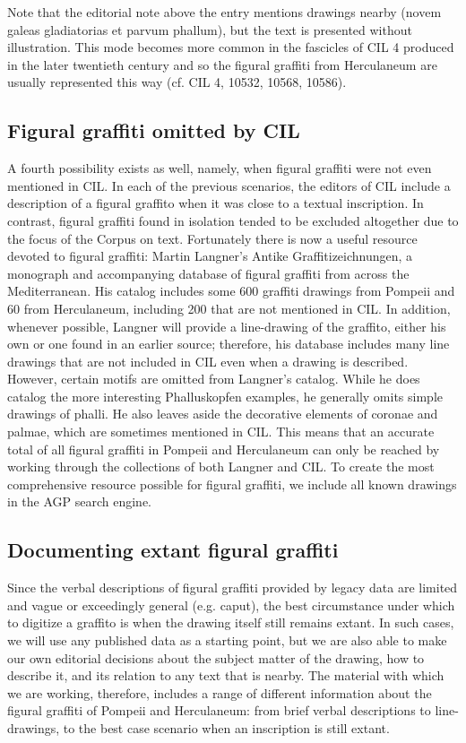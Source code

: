 \documentclass[amsthm,ebook]{saparticle}
\begin{document}
Note that the editorial note above the entry mentions drawings nearby (novem galeas gladiatorias et parvum phallum), but
the text is presented without illustration. This mode becomes more common in the fascicles of CIL 4 produced in the
later twentieth century and so the figural graffiti from Herculaneum are usually represented this way (cf. CIL 4,
10532, 10568, 10586). 




\subsection{Figural graffiti omitted by CIL}


A fourth possibility exists as well, namely, when figural graffiti were not even mentioned in CIL. In each of the
previous scenarios, the editors of CIL include a description of a figural graffito when it was close to a textual
inscription. In contrast, figural graffiti found in isolation tended to be excluded altogether due to the focus of the
Corpus on text. Fortunately there is now a useful resource devoted to figural graffiti: Martin Langner’s Antike
Graffitizeichnungen, a monograph and accompanying database of figural graffiti from across the Mediterranean. His
catalog includes some 600 graffiti drawings from Pompeii and 60 from Herculaneum, including 200 that are not mentioned
in CIL. In addition, whenever possible, Langner will provide a line-drawing of the graffito, either his own or one
found in an earlier source; therefore, his database includes many line drawings that are not included in CIL even when
a drawing is described. However, certain motifs are omitted from Langner’s catalog. While he does catalog the more
interesting Phalluskopfen examples, he generally omits simple drawings of phalli. He also leaves aside the decorative
elements of coronae and palmae, which are sometimes mentioned in CIL. This means that an accurate total of all figural
graffiti in Pompeii and Herculaneum can only be reached by working through the collections of both Langner and CIL. To
create the most comprehensive resource possible for figural graffiti, we include all known drawings in the AGP search
engine. 




\subsection{Documenting extant figural graffiti}


\noindent Since the verbal descriptions of figural graffiti provided by legacy data are limited and vague or exceedingly general
(e.g. caput), the best circumstance under which to digitize a graffito is when the drawing itself still remains extant.
 In such cases, we will use any published data as a starting point, but we are also able to make our own editorial
decisions about the subject matter of the drawing, how to describe it, and its relation to any text that is nearby.
The material with which we are working, therefore, includes a range of different information about the figural
graffiti of Pompeii and Herculaneum: from brief verbal descriptions to line-drawings, to the best case scenario when an
inscription is still extant. 
\end{document}
